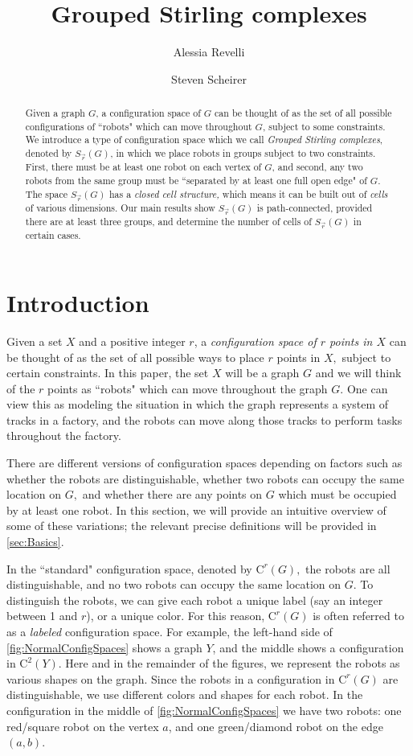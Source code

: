 \documentclass{amsart}
\title{Grouped Stirling complexes}
\author{Alessia Revelli \and Steven Scheirer}
\newcommand{\Sr}{S_{\vec{r}}}
\newcommand{\C}{\mathrm{C}}
\theoremstyle{definition}
\theoremstyle{remark}
\begin{document}
\begin{abstract}
        Given a graph $G$, a configuration space of $G$ can be thought of as the set of all possible configurations of ``robots" which can move throughout $G$, subject to some constraints. We introduce a type of configuration space which we call \textit{Grouped Stirling complexes}, denoted by $\Sr(G)$, in which we place robots in groups subject to two constraints. First, there must be at least one robot on each vertex of $G$, and second, any two robots from the same group must be ``separated by at least one full open edge" of $G$. The space $\Sr(G)$ has a \textit{closed cell structure,} which means it can be built out of \textit{cells} of various dimensions. Our main results show $\Sr(G)$ is path-connected, provided there are at least three groups, and determine the number of cells of $\Sr(G)$ in certain cases.
\end{abstract}
\maketitle

\section{Introduction}\label{sec:Intro}

Given a set $X$ and a positive integer $r$, a \textit{configuration space of $r$ points in $X$} can be thought of as the set of all possible ways to place $r$ points in $X,$ subject to certain constraints. In this paper, the set $X$ will be a graph $G$ and we will think of the $r$ points as ``robots" which can move throughout the graph $G.$ One can view this as modeling the situation in which the graph represents a system of tracks in a factory, and the robots can move along those tracks to perform tasks throughout the factory.

There are different versions of configuration spaces depending on factors such as whether the robots are distinguishable, whether two robots can occupy the same location on $G,$ and whether there are any points on $G$ which must be occupied by at least one robot. In this section, we will provide an intuitive overview of some of these variations; the relevant precise definitions will be provided in \cref{sec:Basics}.

In the ``standard" configuration space, denoted by $\C^r(G),$ the robots are all distinguishable, and no two robots can occupy the same location on $G.$ To distinguish the robots, we can give each robot a unique label (say an integer between 1 and $r$), or a unique color. For this reason, $\C^r(G)$ is often referred to as a \textit{labeled} configuration space. For example, the left-hand side of \cref{fig:NormalConfigSpaces} shows a graph $Y$, and the middle shows a configuration in $\C^2(Y)$. Here and in the remainder of the figures, we represent the robots as various shapes on the graph. Since the robots in a configuration in $\C^r(G)$ are distinguishable, we use different colors and shapes for each robot. In the configuration in the middle of \cref{fig:NormalConfigSpaces} we have two robots: one red/square robot on the vertex $a$, and one green/diamond robot on the edge $(a,b)$.
\end{document}
